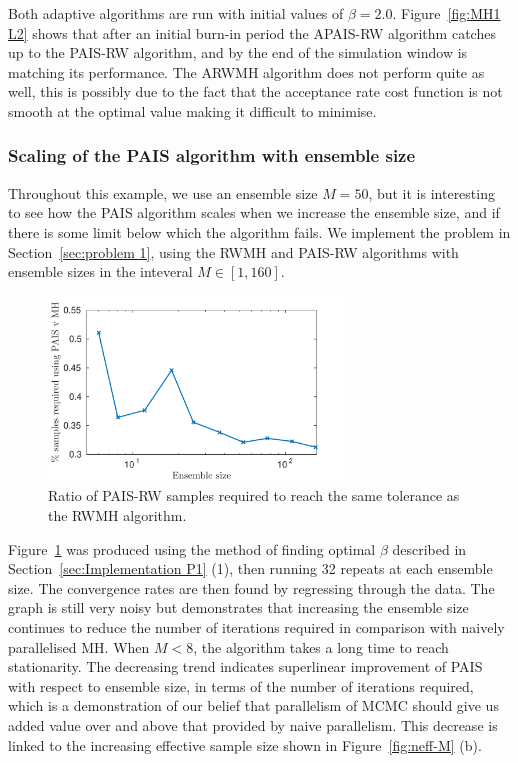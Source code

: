 \documentclass[final]{siamltex}
\begin{document}
Both adaptive algorithms are run with initial values of $\beta=2.0$. Figure~\ref{fig:MH1 L2} shows that after an initial burn-in period the APAIS-RW algorithm catches up to the PAIS-RW algorithm, and by the end of the simulation window is matching its performance. The ARWMH algorithm does not perform quite as well, this is possibly due to the fact that the acceptance rate cost function is not smooth at the optimal value making it difficult to minimise.

\subsubsection{Scaling of the PAIS algorithm with ensemble size}

Throughout this example, we use an ensemble size $M=50$, but it is interesting to see how the PAIS algorithm scales when we increase the ensemble size, and if there is some limit below which the algorithm fails. We implement the problem in Section~\ref{sec:problem 1}, using the RWMH and PAIS-RW algorithms with ensemble sizes in the inteveral $M \in [1, 160]$.

\begin{figure}[h]
\begin{center}
\includegraphics[width=0.7\textwidth]{"figures/PAIS_saving"}
\caption{Ratio of PAIS-RW samples required to reach the same tolerance as the RWMH algorithm.}
\label{fig:PAIS_saving}
\end{center}
\end{figure}

Figure~\ref{fig:PAIS_saving} was produced using the method of finding
optimal $\beta$ described in Section~\ref{sec:Implementation P1} (1),
then running 32 repeats at each ensemble size. The convergence rates
are then found by regressing through the data. The graph is still very
noisy but demonstrates that increasing the ensemble size continues to
reduce the number of iterations required in comparison with naively parallelised MH. When $M<8$, the algorithm takes a long time to reach
stationarity. The decreasing trend indicates superlinear improvement of PAIS with
respect to ensemble size, in terms of the number of iterations
required, which is a demonstration of our belief that parallelism of
MCMC should give us added value over and above that provided by naive parallelism. This decrease is linked to the increasing effective sample size shown in Figure~\ref{fig:neff-M} (b).
\end{document}
